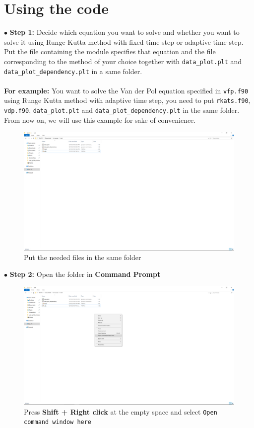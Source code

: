 \documentclass[a4paper,oneside]{book}
\numberwithin{equation}{chapter}
\begin{document}
	\section{Using the code}
	$\bullet$ \textbf{Step 1:} Decide which equation you want to solve and whether you want to solve it using Runge Kutta method with fixed time step or adaptive time step. Put the file containing the module specifies that equation and the file corresponding to the method of your choice together with \texttt{data\_plot.plt} and \texttt{data\_plot\_dependency.plt} in a same folder.\\\\
	\textbf{For example:} You want to solve the Van der Pol equation specified in \texttt{vfp.f90} using Runge Kutta method with adaptive time step, you need to put \texttt{rkats.f90}, \texttt{vdp.f90}, \texttt{data\_plot.plt} and \texttt{data\_plot\_dependency.plt} in the same folder. From now on, we will use this example for sake of convenience.
	\begin{figure}[H]
		\centering	\includegraphics[width=15cm]{wfig1}
		\caption{Put the needed files in the same folder}
	\end{figure}
	\noindent$\bullet$ \textbf{Step 2:} Open the folder in \textbf{Command Prompt}
	\begin{figure}[H]
		\centering	\includegraphics[width=15cm]{wfig2}
		\caption{Press \textbf{Shift + Right click} at the empty space and select \texttt{Open command window here}}
	\end{figure}
\end{document}
